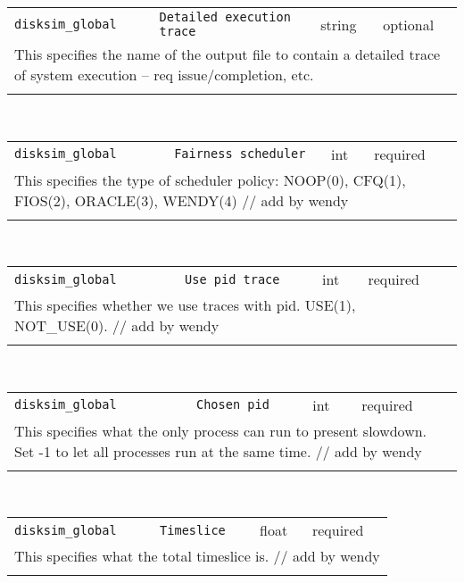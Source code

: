 \noindent 
\begin{tabular}{|p{\lpmodwidth}|p{\lpnamewidth}|p{0.5in}|p{0.5in}|}
\cline{1-4}
\texttt{disksim\_global} & \texttt{Detailed execution trace} & string & optional \\ 
\cline{1-4}
\multicolumn{4}{|p{6in}|}{
This specifies the name of the output file to contain a detailed trace
of system execution -- req issue/completion, etc.
}\\ 
\cline{1-4}
\multicolumn{4}{p{5in}}{}\\
\end{tabular}\\ 
\noindent 
\begin{tabular}{|p{\lpmodwidth}|p{\lpnamewidth}|p{0.5in}|p{0.5in}|}
\cline{1-4}
\texttt{disksim\_global} & \texttt{Fairness scheduler} & int & required \\ 
\cline{1-4}
\multicolumn{4}{|p{6in}|}{
This specifies the type of scheduler policy: NOOP(0), CFQ(1), FIOS(2), ORACLE(3), WENDY(4) // add by wendy
}\\ 
\cline{1-4}
\multicolumn{4}{p{5in}}{}\\
\end{tabular}\\ 
\noindent 
\begin{tabular}{|p{\lpmodwidth}|p{\lpnamewidth}|p{0.5in}|p{0.5in}|}
\cline{1-4}
\texttt{disksim\_global} & \texttt{Use pid trace} & int & required \\ 
\cline{1-4}
\multicolumn{4}{|p{6in}|}{
This specifies whether we use traces with pid. USE(1), NOT_USE(0). // add by wendy
}\\ 
\cline{1-4}
\multicolumn{4}{p{5in}}{}\\
\end{tabular}\\ 
\noindent 
\begin{tabular}{|p{\lpmodwidth}|p{\lpnamewidth}|p{0.5in}|p{0.5in}|}
\cline{1-4}
\texttt{disksim\_global} & \texttt{Chosen pid} & int & required \\ 
\cline{1-4}
\multicolumn{4}{|p{6in}|}{
This specifies what the only process can run to present slowdown. Set -1 to let all processes run at the same time. // add by wendy
}\\ 
\cline{1-4}
\multicolumn{4}{p{5in}}{}\\
\end{tabular}\\ 
\noindent 
\begin{tabular}{|p{\lpmodwidth}|p{\lpnamewidth}|p{0.5in}|p{0.5in}|}
\cline{1-4}
\texttt{disksim\_global} & \texttt{Timeslice} & float & required \\ 
\cline{1-4}
\multicolumn{4}{|p{6in}|}{
This specifies what the total timeslice is. // add by wendy
}\\ 
\cline{1-4}
\multicolumn{4}{p{5in}}{}\\
\end{tabular}\\ 
